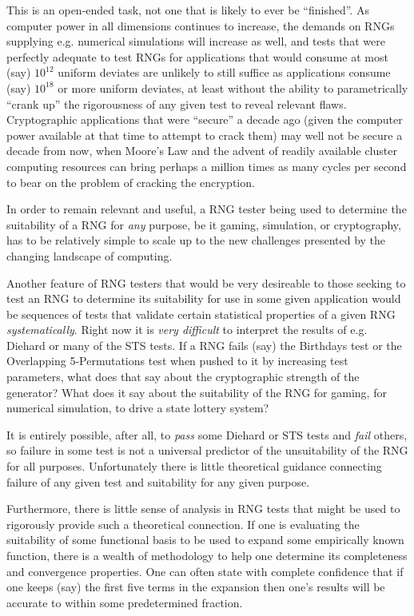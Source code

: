 \documentclass[12pt]{book}
\begin{document}
This is an open-ended task, not one that is likely to ever be
``finished''.  As computer power in all dimensions continues to
increase, the demands on RNGs supplying e.g. numerical simulations will
increase as well, and tests that were perfectly adequate to test RNGs
for applications that would consume at most (say) $10^{12}$ uniform
deviates are unlikely to still suffice as applications consume (say)
$10^{18}$ or more uniform deviates, at least without the ability to
parametrically ``crank up'' the rigorousness of any given test to reveal
relevant flaws.  Cryptographic applications that were ``secure'' a
decade ago (given the computer power available at that time to attempt
to crack them) may well not be secure a decade from now, when Moore's
Law and the advent of readily available cluster computing resources can
bring perhaps a million times as many cycles per second to bear on the
problem of cracking the encryption.

In order to remain relevant and useful, a RNG tester being used to
determine the suitability of a RNG for {\em any} purpose, be it gaming,
simulation, or cryptography, has to be relatively simple to scale up to
the new challenges presented by the changing landscape of computing.

Another feature of RNG testers that would be very desireable to those
seeking to test an RNG to determine its suitability for use in some
given application would be sequences of tests that validate certain
statistical properties of a given RNG {\em systematically}.  Right now
it is {\em very difficult} to interpret the results of e.g. Diehard or
many of the STS tests.  If a RNG fails (say) the Birthdays test or the
Overlapping 5-{}Permutations test when pushed to it by increasing test
parameters, what does that say about the cryptographic strength of the
generator?  What does it say about the suitability of the RNG for
gaming, for numerical simulation, to drive a state lottery system?

It is entirely possible, after all, to {\em pass} some Diehard or STS
tests and {\em fail} others, so failure in some test is not a universal
predictor of the unsuitability of the RNG for all purposes.
Unfortunately there is little theoretical guidance connecting failure of
any given test and suitability for any given purpose.  

Furthermore, there is little sense of analysis in RNG tests that might
be used to rigorously provide such a theoretical connection.  If one is
evaluating the suitability of some functional basis to be used to expand
some empirically known function, there is a wealth of methodology to
help one determine its completeness and convergence properties.  One can
often state with complete confidence that if one keeps (say) the first
five terms in the expansion then one's results will be accurate to
within some predetermined fraction.  
\end{document}
